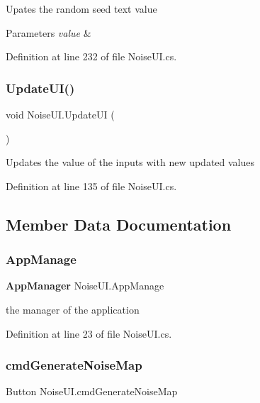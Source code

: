 Upates the random seed text value 


\begin{DoxyParams}{Parameters}
{\em value} & \\
\hline
\end{DoxyParams}


Definition at line 232 of file Noise\+U\+I.\+cs.

\mbox{\label{class_noise_u_i_a48064d96c1f15fdaf7b66814faa324c3}} 
\subsubsection{Update\+U\+I()}
{\footnotesize\ttfamily void Noise\+U\+I.\+Update\+UI (\begin{DoxyParamCaption}{ }\end{DoxyParamCaption})}



Updates the value of the inputs with new updated values 



Definition at line 135 of file Noise\+U\+I.\+cs.



\subsection{Member Data Documentation}
\mbox{\label{class_noise_u_i_a5392c7a037001ff4d9c71dd9bd22edc8}} 
\subsubsection{App\+Manage}
{\footnotesize\ttfamily \textbf{ App\+Manager} Noise\+U\+I.\+App\+Manage}



the manager of the application 



Definition at line 23 of file Noise\+U\+I.\+cs.

\mbox{\label{class_noise_u_i_aed14268532c0007d404fc9a07c630f9f}} 
\subsubsection{cmd\+Generate\+Noise\+Map}
{\footnotesize\ttfamily Button Noise\+U\+I.\+cmd\+Generate\+Noise\+Map}



